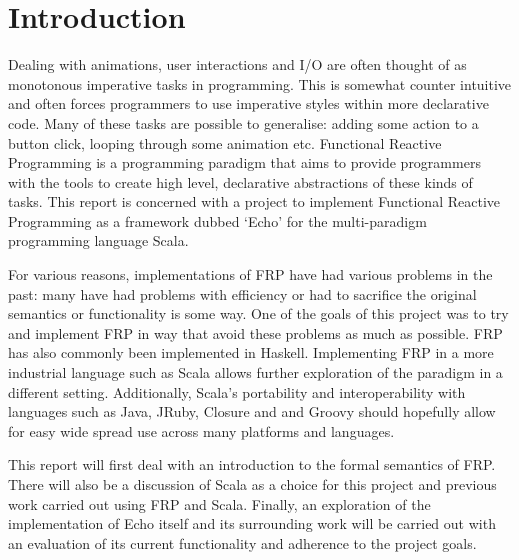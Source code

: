 \chapter{Introduction}

  Dealing with animations, user interactions and I/O are often thought of as monotonous imperative tasks
  in programming. This is somewhat counter intuitive and often forces programmers to use imperative
  styles within more declarative code. Many of these tasks are possible to generalise: adding
  some action to a button click, looping through some animation etc. Functional Reactive Programming
  is a programming paradigm that aims to provide programmers with the tools to create high level,
  declarative abstractions of these kinds of tasks. This report is concerned with a project to
  implement Functional Reactive Programming as a framework dubbed `Echo' \cite{Stott} for the multi-paradigm programming language
  Scala.

  For various reasons, implementations of FRP have had various problems in the past: many have had problems
  with efficiency or had to sacrifice the original semantics or functionality is some way. One of the goals
  of this project was to try and implement FRP in way that avoid these problems as much as possible. FRP
  has also commonly been implemented in Haskell. Implementing FRP in a more industrial language such as Scala allows
  further exploration of the paradigm in a different setting. Additionally, Scala's portability and interoperability with
  languages such as Java, JRuby, Closure and and Groovy should hopefully allow for easy wide spread use across many platforms and languages. 

  This report will first deal with an introduction to the formal semantics of FRP. There will also be a discussion of Scala as a 
  choice for this project and previous work carried out using FRP and Scala.
  Finally, an exploration of the implementation of Echo itself and its surrounding work will be carried out with an
  evaluation of its current functionality and adherence to the project goals.